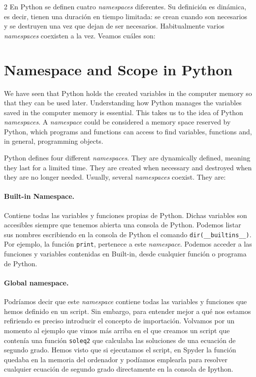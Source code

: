 \begin{paracol}{2}
En Python se definen cuatro \emph{namespaces} diferentes. Su definición es dinámica, es decir, tienen una duración en tiempo limitada: se crean cuando son necesarios y se destruyen una vez que dejan de ser necesarios. Habitualmente varios \emph{namespaces} coexisten a la vez. Veamos cuáles son:

\switchcolumn
\section[Namespace and scope in Python]{Namespace and Scope in Python}
We have seen that Python holds the created variables in the computer memory so that they can be used later. Understanding how Python manages the variables saved in the computer memory is essential. This takes us to the idea of Python \emph{namespaces}.
A \emph{namespace} could be considered a memory space reserved by Python, which programs and functions can access to find variables, functions and, in general, programming objects.

Python defines four different \emph{namespaces}. They are dynamically defined, meaning they last for a limited time. They are created when necessary and destroyed when they are no longer needed. Usually, several \emph{namespaces} coexist. They are:

\switchcolumn
\paragraph{Built-in Namespace.} Contiene todas las variables y funciones propias de Python. Dichas variables son accesibles siempre que tenemos abierta una consola de Python. Podemos listar sus nombres escribiendo en la consola de Python el comando \texttt{dir(__builtins__)}. Por ejemplo, la función \texttt{print}, pertenece a este \emph{namespace}. Podemos acceder a las funciones y variables contenidas en Built-in, desde cualquier función o programa de Python.

\paragraph{Global namespace.} Podríamos decir que este \emph{namespace} contiene todas las variables y funciones que hemos definido en un script. Sin embargo, para entender mejor a qué nos estamos refiriendo es preciso introducir el concepto de importación. Volvamos por un momento al ejemplo que vimos más arriba en el que creamos un script que contenía una función \texttt{soleq2} que calculaba las soluciones de una ecuación de segundo grado. Hemos visto que si ejecutamos el script, en Spyder la función quedaba en la memoria del ordenador y podíamos emplearla para resolver cualquier ecuación de segundo grado directamente en la consola de Ipython.


\end{paracol}
